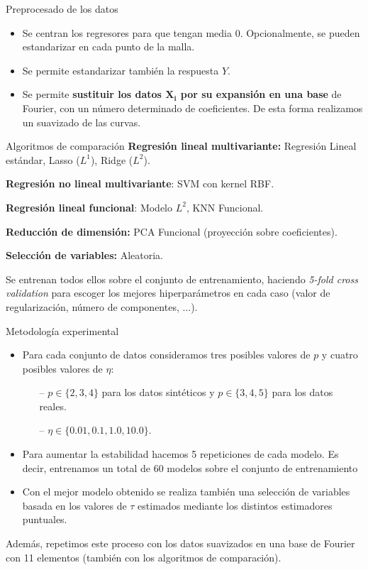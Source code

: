 \documentclass[10pt, spanish, professionalfonts]{beamer}
\begin{document}
\begin{frame}{Preprocesado de los datos}
  \begin{itemize}
    \item Se centran los regresores para que tengan media \(0\). Opcionalmente, se pueden estandarizar en cada punto de la malla.
    \item Se permite estandarizar también la respuesta \(Y\).
    \item Se permite \textbf{sustituir los datos \(\boldsymbol{X_i}\) por su expansión en una base} de Fourier, con un número determinado de coeficientes. De esta forma realizamos un suavizado de las curvas.
  \end{itemize}
\end{frame}

\begin{frame}{Algoritmos de comparación}
  \textbf{Regresión lineal multivariante:} Regresión Lineal estándar, Lasso (\(L^1\)), Ridge (\(L^2\)).

  \textbf{Regresión no lineal multivariante}: SVM con kernel RBF.

  \textbf{Regresión lineal funcional}: Modelo \(L^2\), KNN Funcional.

  \textbf{Reducción de dimensión:} PCA Funcional (proyección sobre coeficientes).

  \textbf{Selección de variables:} Aleatoria.

  \vspace{1em}

  Se entrenan todos ellos sobre el conjunto de entrenamiento, haciendo \textit{5-fold cross validation} para escoger los mejores hiperparámetros en cada caso (valor de regularización, número de componentes, ...).
\end{frame}

\begin{frame}{Metodología experimental}
  \begin{itemize}
  \item Para cada conjunto de datos consideramos tres posibles valores de \(p\) y cuatro posibles valores de \(\eta\):
  \begin{itemize}
    \item[--] \(p\in \{2,3,4\}\) para los datos sintéticos y \(p\in \{3, 4, 5\}\) para los datos reales.
      \item[--] \(\eta \in \{0.01, 0.1, 1.0, 10.0\}\).
  \end{itemize}

  \item Para aumentar la estabilidad hacemos 5 repeticiones de cada modelo. Es decir, entrenamos un total de 60 modelos sobre el conjunto de entrenamiento

  \item Con el mejor modelo obtenido se realiza también una selección de variables basada en los valores de \(\tau\) estimados mediante los distintos estimadores puntuales.
\end{itemize}

Además, repetimos este proceso con los datos suavizados en una base de Fourier con 11 elementos (también con los algoritmos de comparación).
\end{frame}
\end{document}

